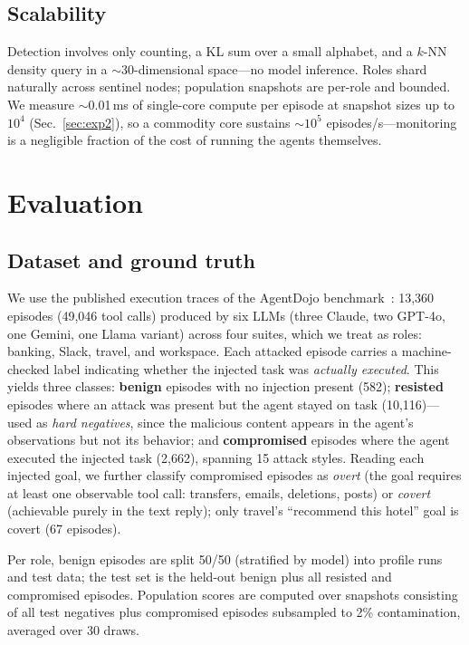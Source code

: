 \documentclass[conference]{IEEEtran}
\begin{document}
\subsection{Scalability}
Detection involves only counting, a KL sum over a small alphabet, and a $k$-NN density query in a $\sim$30-dimensional space---no model inference. Roles shard naturally across sentinel nodes; population snapshots are per-role and bounded. We measure $\sim$0.01\,ms of single-core compute per episode at snapshot sizes up to $10^4$ (Sec.~\ref{sec:exp2}), so a commodity core sustains $\sim$$10^5$ episodes/s---monitoring is a negligible fraction of the cost of running the agents themselves.

\section{Evaluation}\label{sec:eval}

\subsection{Dataset and ground truth}\label{sec:dataset}
We use the published execution traces of the AgentDojo benchmark~\cite{debenedetti2024agentdojo}: 13{,}360 episodes (49{,}046 tool calls) produced by six LLMs (three Claude, two GPT-4o, one Gemini, one Llama variant) across four suites, which we treat as roles: banking, Slack, travel, and workspace. Each attacked episode carries a machine-checked label indicating whether the injected task was \emph{actually executed}. This yields three classes: \textbf{benign} episodes with no injection present (582); \textbf{resisted} episodes where an attack was present but the agent stayed on task (10{,}116)---used as \emph{hard negatives}, since the malicious content appears in the agent's observations but not its behavior; and \textbf{compromised} episodes where the agent executed the injected task (2{,}662), spanning 15 attack styles. Reading each injected goal, we further classify compromised episodes as \emph{overt} (the goal requires at least one observable tool call: transfers, emails, deletions, posts) or \emph{covert} (achievable purely in the text reply); only travel's ``recommend this hotel'' goal is covert (67 episodes).

Per role, benign episodes are split 50/50 (stratified by model) into profile runs and test data; the test set is the held-out benign plus all resisted and compromised episodes. Population scores are computed over snapshots consisting of all test negatives plus compromised episodes subsampled to 2\% contamination, averaged over 30 draws.
\end{document}
